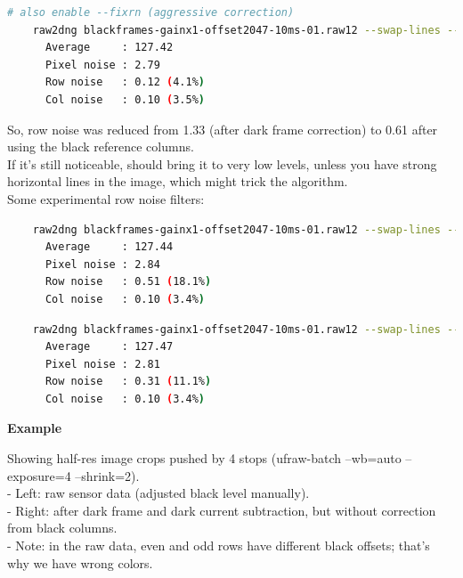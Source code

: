{\begin{lstlisting}[language=bash,morekeywords=$,keywordstyle=\bfseries,frame=none,xleftmargin=.25in,belowskip=2em, aboveskip=2em]
    # also enable --fixrn (aggressive correction)
    raw2dng blackframes-gainx1-offset2047-10ms-01.raw12 --swap-lines --fixrn --check-darkframe
      Average     : 127.42
      Pixel noise : 2.79
      Row noise   : 0.12 (4.1%)
      Col noise   : 0.10 (3.5%)
\end{lstlisting}

So, row noise was reduced from 1.33 (after dark frame correction) to 0.61 after using the black reference columns.\\

If it's still noticeable,  should bring it to very low levels, unless you have strong horizontal lines in the image, which might trick the algorithm.\\

Some experimental row noise filters:\\

\begin{lstlisting}[language=bash,morekeywords=$,keywordstyle=\bfseries,frame=none,xleftmargin=.25in,belowskip=2em, aboveskip=2em]
    % 2-tap FIR, separate for odd/even rows
    raw2dng blackframes-gainx1-offset2047-10ms-01.raw12 --swap-lines --rnfilter=1 --check-darkframe
      Average     : 127.44
      Pixel noise : 2.84
      Row noise   : 0.51 (18.1%)
      Col noise   : 0.10 (3.4%)
\end{lstlisting}

\begin{lstlisting}[language=bash,morekeywords=$,keywordstyle=\bfseries,frame=none,xleftmargin=.25in,belowskip=2em, aboveskip=2em]
    % that ugly FIR that also looks at green channel differences
    raw2dng blackframes-gainx1-offset2047-10ms-01.raw12 --swap-lines --rnfilter=2 --check-darkframe
      Average     : 127.47
      Pixel noise : 2.81
      Row noise   : 0.31 (11.1%)
      Col noise   : 0.10 (3.4%)
\end{lstlisting}


\textbf{Example}

Showing half-res image crops pushed by 4 stops (ufraw-batch --wb=auto --exposure=4 --shrink=2).\\


- Left: raw sensor data (adjusted black level manually).\\
- Right: after dark frame and dark current subtraction, but without correction from black columns.\\
- Note: in the raw data, even and odd rows have different black offsets; that's why we have wrong colors.\\ 

}
